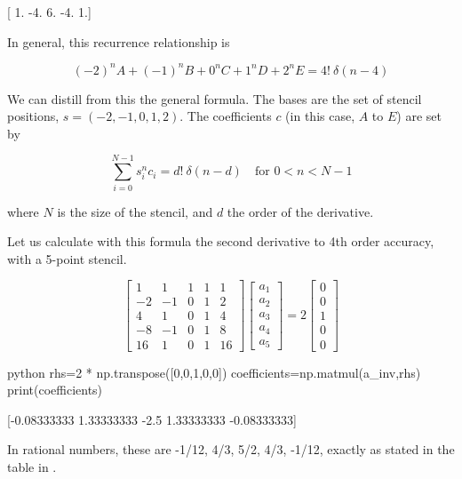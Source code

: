 [ 1. -4.  6. -4.  1.]


In general, this recurrence relationship is 

\begin{equation}
(-2)^n A + (-1)^nB + 0^n C + 1^nD + 2^nE = 4! \ \delta(n-4)
\end{equation}

We can distill from this the general formula. The bases are the set of stencil positions, $s=(-2,-1,0,1,2)$. The coefficients $c$ (in this case, $A$ to $E$) are set by 

\begin{equation}
\boxed{
\sum_{i=0}^{N-1} s_i^n c_i = d! \ \delta(n-d) \quad \mbox{for $0 < n < N-1$} 
}
\end{equation}


where $N$ is the size of the stencil, and $d$ the order of the derivative. 

Let us calculate with this formula the second derivative to 4th order accuracy, with a 5-point stencil.

\begin{equation}
\left[
\begin{array}{ccccc}
1&1&1&1&1\\
-2&-1&0&1&2\\
4&1&0&1&4\\
-8&-1&0&1&8\\
16&1&0&1&16
\end{array}\right]
\left[
\begin{array}{c}
a_1\\
a_2\\
a_3\\
a_4\\
a_5
\end{array}\right]=2\left[
\begin{array}{c}
0\\
0\\
1\\
0\\
0
\end{array}\right]
\end{equation}

\begin{mintedbox}{python}
rhs=2 * np.transpose([0,0,1,0,0])
coefficients=np.matmul(a_inv,rhs) 
print(coefficients)
\end{mintedbox} 

[-0.08333333  1.33333333 -2.5         1.33333333 -0.08333333]

In rational numbers, these are -1/12, 4/3, 5/2, 4/3, -1/12, exactly as
stated in the table in .

